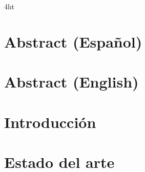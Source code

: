 \documentclass[
  a4paper,  %
  twoside,  %
  bibliography=totoc,
  headsepline,
  cleardoublepage=empty,
  parskip=half,
  draft=false
]{scrbook}
\begin{document}
\printnoidxglossaries

\iftex4ht
\else
\fi



\renewcommand*{\chapterpagestyle}{scrplain}
\pagestyle{scrheadings}
\pagestyle{scrheadings}
\ihead[]{}
\chead[]{}
\ohead[]{\headmark}
\cfoot[]{}
\ifoot[]{}

































%
%


\chapter{Abstract (Español)}


\chapter{Abstract (English)}




\chapter{Introducción}




\chapter{Estado del arte}

\end{document}
